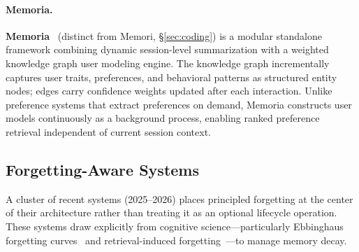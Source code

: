 \paragraph{Memoria.}
\textbf{Memoria}~\cite{memoria2024} (distinct from Memori, \S\ref{sec:coding}) is a modular
standalone framework combining dynamic session-level summarization with
a weighted knowledge graph user modeling engine.  The knowledge graph
incrementally captures user traits, preferences, and behavioral
patterns as structured entity nodes; edges carry confidence weights
updated after each interaction.  Unlike preference systems that extract
preferences on demand, Memoria constructs user models continuously as a
background process, enabling ranked preference retrieval independent of
current session context.

\subsection{Forgetting-Aware Systems}
\label{sec:forgetting-systems}

A cluster of recent systems (2025--2026) places principled forgetting at
the center of their architecture rather than treating it as an optional
lifecycle operation.  These systems draw explicitly from cognitive
science---particularly Ebbinghaus forgetting
curves~\cite{ebbinghaus1885} and retrieval-induced
forgetting~\cite{anderson1994}---to manage memory decay.

